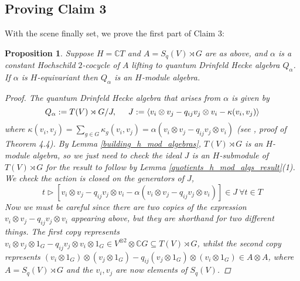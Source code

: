 \documentclass[10pt]{article}
\newcommand{\bb}{\medbreak}
\newcommand{\nt}{\noindent}
\newcommand{\Cc }{\mathbb{C}}
\newtheorem{proposition}[lemma]{Proposition}
\theoremstyle{definition}
\begin{document}
\subsection{Proving Claim 3}\label{claim_3}

\nt With the scene finally set, we prove the first part of Claim 3:

\begin{proposition}\label{is_an_h_mod_alg} Suppose $H=\Cc  T$ and $A=S_q(V)\rtimes G$ are as above, and $\alpha$ is a constant Hochschild $2$-cocycle of $A$ lifting to quantum Drinfeld Hecke algebra $Q_\alpha$. If $\alpha$ is $H$-equivariant then $Q_\alpha$ is an $H$-module algebra.
\begin{proof}
The quantum Drinfeld Hecke algebra that arises from $\alpha$ is given by
$$Q_\alpha:=T(V)\rtimes G/J,\hspace{.5cm} J:=\langle v_i\otimes v_j-q_{ij}v_j\otimes v_i-\kappa (v_i,v_j)\rangle$$
where $\kappa(v_i,v_j)=\sum_{g\in G}\kappa_g(v_i,v_j)=\alpha(v_i\otimes v_j-q_{ij}v_j\otimes v_i)$ (see \cite{2011arXiv11115243N}, proof of Theorem 4.4). By Lemma \ref{building_h_mod_algebras}, $T(V)\rtimes G$ is an $H$-module algebra, so we just need to check the ideal $J$ is an $H$-submodule of $T(V)\rtimes G$ for the result to follow by Lemma \ref{quotients_h_mod_algs_result}(1). We check the action is closed on the generators of $J$, 
\begin{equation}\label{nasty_submodule_eqn}
t\rhd [v_i\otimes v_j-q_{ij}v_j\otimes v_i-\alpha(v_i\otimes v_j-q_{ij}v_j\otimes v_i)]\in J\ \forall t\in T
\end{equation}
Now we must be careful since there are two copies of the expression $v_i\otimes v_j-q_{ij}v_j\otimes v_i$ appearing above, but they are shorthand for two different things. The first copy represents $v_i\otimes v_j\otimes 1_G-q_{ij}v_j\otimes v_i\otimes 1_G\in V^{\otimes 2}\otimes \Cc  G\subseteq T(V)\rtimes G$, whilst the second copy represents $(v_i\otimes 1_G)\otimes (v_j\otimes 1_G)-q_{ij}(v_j\otimes 1_G)\otimes (v_i\otimes 1_G)\in A\otimes A$, where $A=S_q(V)\rtimes G$ and the $v_i,v_j$ are now elements of $S_q(V)$.\bb


\end{proof}
\end{proposition}
\end{document}
